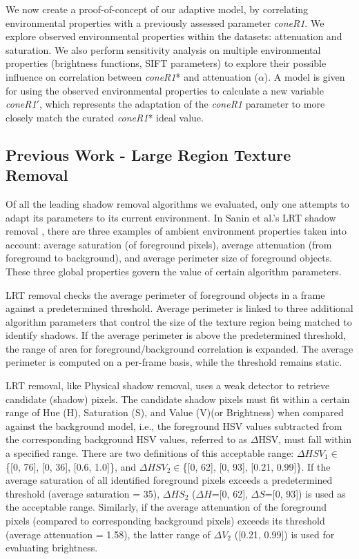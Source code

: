 We now create a proof-of-concept of our adaptive model, by correlating environmental properties with a previously assessed parameter \textit{coneR1}. We explore observed environmental properties within the datasets: attenuation and saturation. We also perform sensitivity analysis on multiple environmental properties (brightness functions, SIFT parameters) to explore their possible influence on correlation between \textit{coneR1}* and attenuation ($\alpha$). A model is given for using the observed environmental properties to calculate a new variable \textit{coneR1}$'$, which represents the adaptation of the \textit{coneR1} parameter to more closely match the curated \textit{coneR1}* ideal value.

\subsection{Previous Work - Large Region Texture Removal} \label{section:prevworkLRT}

Of all the leading shadow removal algorithms we evaluated, only one attempts to adapt its parameters to its current environment. In Sanin et al.'s LRT shadow removal \cite{sanin2010improved}, there are three examples of ambient environment properties taken into account: average saturation (of foreground pixels), average attenuation (from foreground to background), and average perimeter size of foreground objects. These three global properties govern the value of certain algorithm parameters.

LRT removal checks the average perimeter of foreground objects in a frame against a predetermined threshold. Average perimeter is linked to three additional algorithm parameters that control the size of the texture region being matched to identify shadows. If the average perimeter is above the predetermined threshold, the range of area for foreground/background correlation is expanded. The average perimeter is computed on a per-frame basis, while the threshold remains static.

LRT removal, like Physical shadow removal, uses a weak detector to retrieve candidate (shadow) pixels. The candidate shadow pixels must fit within a certain range of Hue (H), Saturation (S), and Value (V)(or Brightness) when compared against the background model, i.e., the foreground HSV values subtracted from the corresponding background HSV values, referred to as $\Delta$HSV, must fall within a specified range. There are two definitions of this acceptable range: $\Delta HSV_{1}\in$\{[0, 76], [0, 36], [0.6, 1.0]\}, and $\Delta HSV_{2}\in$\{[0, 62], [0, 93], [0.21, 0.99]\}. If the average saturation of all identified foreground pixels exceeds a predetermined threshold (average saturation = 35), $\Delta HS_{2}$ ($\Delta H$=[0, 62], $\Delta S$=[0, 93]) is used as the acceptable range. Similarly, if the average attenuation of the foreground pixels (compared to corresponding background pixels) exceeds its threshold (average attenuation = 1.58), the latter range of $\Delta V_{2}$ ([0.21, 0.99]) is used for evaluating brightness. 

